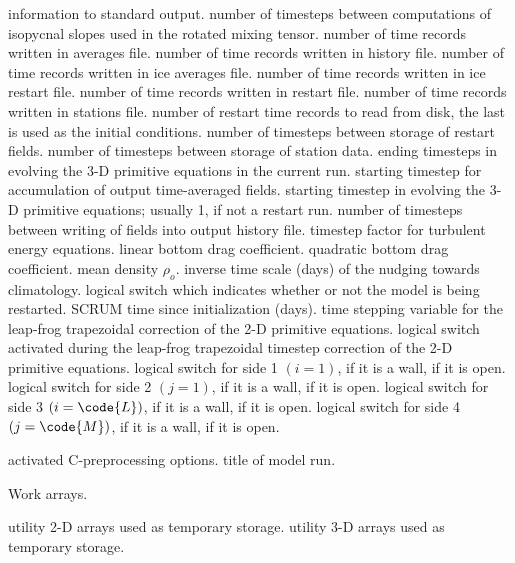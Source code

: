 \begin{klist}
\begin{klist}
    information to standard output.
       number of timesteps between computations of
    isopycnal slopes used in the rotated mixing tensor.
       number of time records written in averages file.
       number of time records written in history file.
      number of time records written in ice averages
    file.
      number of time records written in ice restart
    file.
       number of time records written in restart file.
       number of time records written in stations file.
         number of restart time records to read from disk,
    the last is used as the initial conditions.
          number of timesteps between storage of restart
    fields.
          number of timesteps between storage of station
    data.
        ending timesteps in evolving the 3-D primitive
    equations in the current run.
        starting timestep for accumulation of output
    time-averaged fields.
       starting timestep in evolving the 3-D primitive
    equations; usually 1, if not a restart run.
          number of timesteps between writing of fields into
    output history file.
        timestep factor for turbulent energy equations.
          linear bottom drag coefficient.
         quadratic bottom drag coefficient.
          mean density $\rho_o$.
         inverse time scale (days) of the nudging towards
    climatology.
       logical switch which indicates whether or not the
    model is being restarted.
         SCRUM time since initialization (days).
      time stepping variable for the leap-frog
    trapezoidal correction of the 2-D primitive equations.
      logical switch activated during the leap-frog
    trapezoidal timestep correction of the 2-D primitive equations.
         logical switch for side 1 $(i=1)$,
     if it is a wall,  if it is open.
         logical switch for side 2 $(j=1)$,
     if it is a wall,  if it is open.
         logical switch for side 3 $(i=\code{L})$,
     if it is a wall,  if it is open.
         logical switch for side 4 $(j=\code{M})$,
     if it is a wall,  if it is open.
    \end{klist}
    \mbox{}
    \begin{klist}
          activated C-preprocessing options.
             title of model run.
    \end{klist}
    Work arrays.
    \begin{klist}
         utility 2-D arrays used as temporary storage.
         utility 3-D arrays used as temporary storage.
    \end{klist}
\end{klist}
